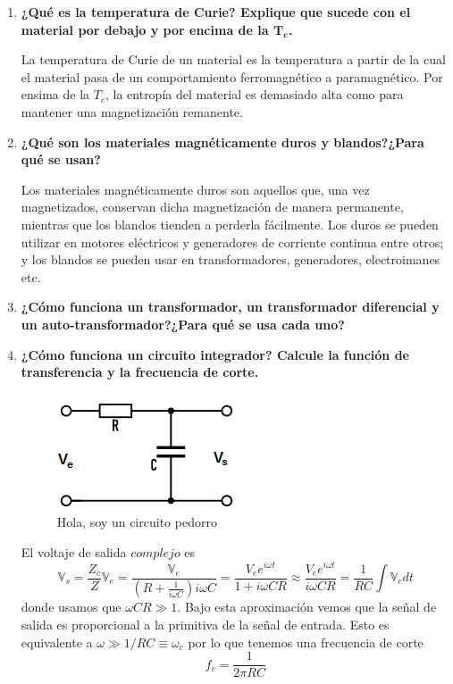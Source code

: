 \documentclass[a4paper,10pt,fleqn,oneside]{article}
\begin{document}
\begin{enumerate}[1.]
	\item \textbf{¿Qué es la temperatura de Curie? Explique que sucede con el material por debajo y por encima de la $\mathbf{T_c}$.}
	
	La temperatura de Curie de un material es la temperatura a partir de la cual el material pasa de un comportamiento ferromagnético a paramagnético. Por ensima de la $T_c$, la entropía del material es demasiado alta como para mantener una magnetización remanente. 
	\item \textbf{¿Qué son los materiales magnéticamente duros y blandos?¿Para qué se usan?}
	
	Los materiales magnéticamente duros son aquellos que, una vez magnetizados, conservan dicha magnetización de manera permanente, mientras que los blandos tienden a perderla fácilmente.
	Los duros se pueden utilizar en motores eléctricos y generadores de corriente continua entre otros; y los blandos se pueden usar en transformadores, generadores, electroimanes etc.
	\item \textbf{¿Cómo funciona un transformador, un transformador diferencial y un auto-transformador?¿Para qué se usa cada uno?}
	\item \textbf{¿Cómo funciona un circuito integrador? Calcule la función de transferencia y la frecuencia de corte.} 
	
	\begin{figure}[h]
		\centering
		\includegraphics[scale=0.75]{integrador.png}
		\caption{Hola, soy un circuito pedorro}
		\label{Int}
	\end{figure}
	
	El voltaje de salida $complejo$ es \[\mathbb{V}_s = \frac{Z_c}{Z}\mathbb{V}_e = \frac{\mathbb{V}_e}{(R+\frac{1}{i\omega C})i\omega C} = \frac{V_ee^{i\omega t}}{1+i\omega CR}\approx \frac{V_e e^{i\omega t} }{i\omega C R} = \frac{1}{RC}\int \mathbb{V}_e dt\]
	donde usamos que $\omega CR\gg 1$. Bajo esta aproximación vemos que la señal de salida es proporcional a la primitiva de la señal de entrada. Esto es equivalente a $\omega \gg 1/RC \equiv \omega_c$ por lo que tenemos una frecuencia de corte \[ f_c = \frac{1}{2\pi RC} \]
	

\end{enumerate}
\end{document}
